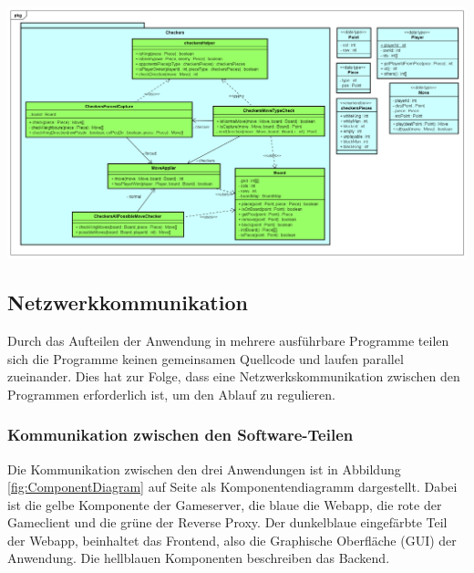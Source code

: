 \documentclass[12pt,a4paper,bibliography=totocnumbered,listof=totocnumbered]{article}
\begin{document}
\vspace{1em}
\begin{minipage}{\linewidth}
	\centering
	\includegraphics[width=1.0\linewidth]{pics/GameLogic.png}
	\label{fig:GameLogic}
\end{minipage}



\subsection{Netzwerkkommunikation}
\label{chap:Networkcom}
Durch das Aufteilen der Anwendung in mehrere ausführbare Programme teilen sich die Programme keinen gemeinsamen Quellcode und laufen parallel zueinander. 
Dies hat zur Folge, dass eine Netzwerkskommunikation zwischen den Programmen erforderlich ist, um den Ablauf zu regulieren.

\subsubsection{Kommunikation zwischen den Software-Teilen}
Die Kommunikation zwischen den drei Anwendungen ist in Abbildung \ref{fig:ComponentDiagram} auf Seite \pageref{fig:ComponentDiagram} als 
Komponentendiagramm dargestellt. Dabei ist die gelbe Komponente der Gameserver, die blaue die Webapp, die rote der Gameclient und die grüne der Reverse Proxy.
Der dunkelblaue eingefärbte Teil der Webapp, beinhaltet das Frontend, also die Graphische Oberfläche (GUI) der Anwendung.
Die hellblauen Komponenten beschreiben das Backend. 
\end{document}

